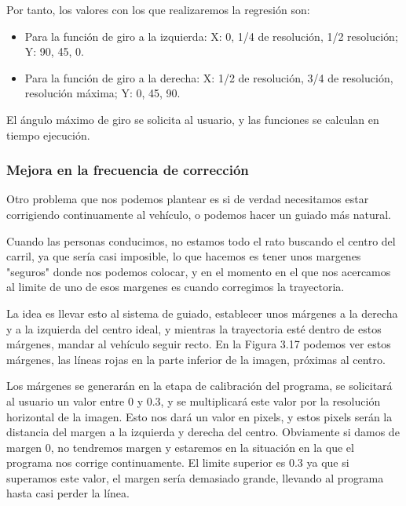 
Por tanto, los valores con los que realizaremos la regresión son:

\begin{itemize}

	\item Para la función de giro a la izquierda: X: 0, 1/4 de resolución, 1/2 resolución; Y: 90, 45, 0.
	
	\item Para la función de giro a la derecha: X: 1/2 de resolución, 3/4 de resolución, resolución máxima; Y: 0, 45, 90.
\end{itemize}

El ángulo máximo de giro se solicita al usuario, y las funciones se calculan en tiempo ejecución.

\subsubsection{Mejora en la frecuencia de corrección}
Otro problema que nos podemos plantear es si de verdad necesitamos estar corrigiendo continuamente al vehículo, o podemos hacer un guiado más natural.

Cuando las personas conducimos, no estamos todo el rato buscando el centro del carril, ya que sería casi imposible, lo que hacemos es tener unos margenes "seguros" donde nos podemos colocar, y en el momento en el que nos acercamos al limite de uno de esos margenes es cuando corregimos la trayectoria.

La idea es llevar esto al sistema de guiado, establecer unos márgenes a la derecha y a la izquierda del centro ideal, y mientras la trayectoria esté dentro de estos márgenes, mandar al vehículo seguir recto. En la Figura 3.17 podemos ver estos márgenes, las líneas rojas en la parte inferior de la imagen, próximas al centro.

Los márgenes se generarán en la etapa de calibración del programa, se solicitará al usuario un valor entre 0 y 0.3, y se multiplicará este valor por la resolución horizontal de la imagen. Esto nos dará un valor en pixels, y estos pixels serán la distancia del margen a la izquierda y derecha del centro. Obviamente si damos de margen 0, no tendremos margen y estaremos en la situación en la que el programa nos corrige continuamente. El limite superior es 0.3 ya que si superamos este valor, el margen sería demasiado grande, llevando al programa hasta casi perder la línea. 

